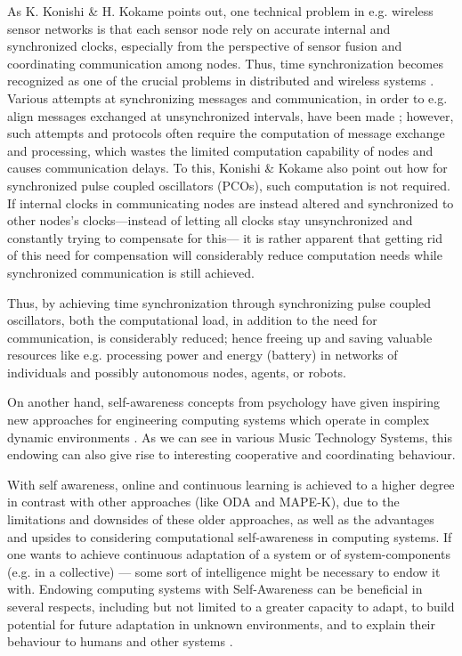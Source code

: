 As K. Konishi \& H. Kokame \cite{konishi_kokame} points out, one technical problem in e.g. wireless sensor networks is that each sensor node rely on accurate internal and synchronized clocks, especially from the perspective of sensor fusion and coordinating communication among nodes. Thus, time synchronization becomes recognized as one of the crucial problems in distributed and wireless systems \cite{tungvinte_sync_protocols}. Various attempts at synchronizing messages and communication, in order to e.g. align messages exchanged at unsynchronized intervals, have been made \cite{tungvinte_sync_protocols}; however, such attempts and protocols often require the computation of message exchange and processing, which wastes the limited computation capability of nodes and causes communication delays. To this, Konishi \& Kokame \cite{konishi_kokame} also point out how for synchronized pulse coupled oscillators (PCOs), such computation is not required. If internal clocks in communicating nodes are instead altered and synchronized to other nodes's clocks—instead of letting all clocks stay unsynchronized and constantly trying to compensate for this— it is rather apparent that getting rid of this need for compensation will considerably reduce computation needs while synchronized communication is still achieved.

Thus, by achieving time synchronization \cite{tungvinte_sync_protocols} through synchronizing pulse coupled oscillators, both the computational load, in addition to the need for communication, is considerably reduced; hence freeing up and saving valuable resources like e.g. processing power and energy (battery) in networks of individuals and possibly autonomous nodes, agents, or robots.



On another hand, self-awareness concepts from psychology have given inspiring new approaches for engineering computing systems which operate in complex dynamic environments \cite{sacs16_ch2}. As we can see in various Music Technology Systems, this endowing can also give rise to interesting cooperative and coordinating behaviour.

With self awareness, online and continuous learning is achieved to a higher degree in contrast with other approaches (like ODA and MAPE-K), due to the limitations and downsides of these older approaches, as well as the advantages and upsides to considering computational self-awareness in computing systems. If one wants to achieve continuous adaptation of a system or of system-components (e.g. in a collective) — some sort of intelligence might be necessary to endow it with. Endowing computing systems with Self-Awareness can be beneficial in several respects, including but not limited to a greater capacity to adapt, to build potential for future adaptation in unknown environments, and to explain their behaviour to humans and other systems \cite{sacs17_ch3}.

